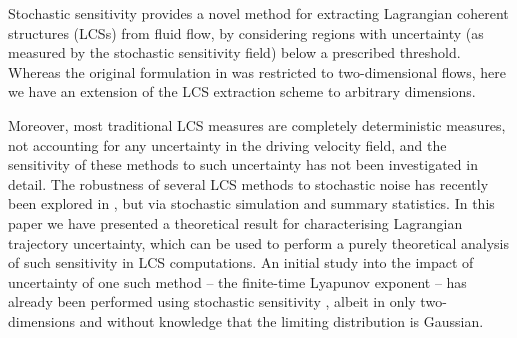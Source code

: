 



Stochastic sensitivity provides a novel method for extracting Lagrangian coherent structures (LCSs) \cite{BalasuriyaEtAl_2018_GeneralizedLagrangianCoherent, HadjighasemEtAl_2017_CriticalComparisonLagrangian} from fluid flow, by considering regions with uncertainty (as measured by the stochastic sensitivity field) below a prescribed threshold.
Whereas the original formulation in \cite{Balasuriya_2020_StochasticSensitivityComputable} was restricted to two-dimensional flows, here we have an extension of the LCS extraction scheme to arbitrary dimensions.


Moreover, most traditional LCS measures are completely deterministic measures, not accounting for any uncertainty in the driving velocity field, and the sensitivity of these methods to such uncertainty has not been investigated in detail.
The robustness of several LCS methods to stochastic noise has recently been explored in \cite{BadzaEtAl_2023_HowSensitiveAre}, but via stochastic simulation and summary statistics.
In this paper we have presented a theoretical result for characterising Lagrangian trajectory uncertainty, which can be used to perform a purely theoretical analysis of such sensitivity in LCS computations.
An initial study into the impact of uncertainty of one such method -- the finite-time Lyapunov exponent -- has already been performed using stochastic sensitivity \cite{Balasuriya_2020_UncertaintyFinitetimeLyapunov}, albeit in only two-dimensions and without knowledge that the limiting distribution is Gaussian.
